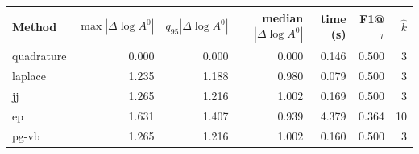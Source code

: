 \begin{tabular}{lrrrrrr}\toprule
Method & $\max|\Delta \log A^0|$ & $q_{95}|\Delta \log A^0|$ & median $|\Delta \log A^0|$ & time (s) & F1@$\tau$ & $\hat{k}$\\\midrule
quadrature & 0.000 & 0.000 & 0.000 & 0.146 & 0.500 & 3\\
laplace & 1.235 & 1.188 & 0.980 & 0.079 & 0.500 & 3\\
jj & 1.265 & 1.216 & 1.002 & 0.169 & 0.500 & 3\\
ep & 1.631 & 1.407 & 0.939 & 4.379 & 0.364 & 10\\
pg-vb & 1.265 & 1.216 & 1.002 & 0.160 & 0.500 & 3\\
\bottomrule\end{tabular}
